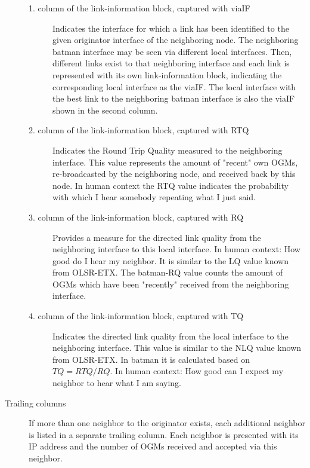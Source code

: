 \documentclass[11pt]{article}
\begin{document}
\begin{description}
\begin{description}

 \item[1. column of the link-information block, captured with viaIF] Indicates the interface for which a link has been identified to the given originator interface of the neighboring node. The neighboring batman interface may be seen via different local interfaces. Then, different links exist to that neighboring interface and each link is represented with its own link-information block, indicating the corresponding local interface as the viaIF. The local interface with the best link to the neighboring batman interface is also the viaIF shown in the second column.


 \item[2. column of the link-information block, captured with RTQ] Indicates the Round Trip Quality measured to the neighboring interface. This value represents the amount of "recent" own OGMs, re-broadcasted by the neighboring node, and received back by this node. In human context the RTQ value indicates the probability with which I hear somebody repeating what I just said.

 \item[3. column of the link-information block, captured with RQ] Provides a measure for the directed link quality from the neighboring interface to this local interface. In human context: How good do I hear my neighbor. It is similar to the LQ value known from OLSR-ETX. The batman-RQ value counts the amount of OGMs which have been "recently" received from the neighboring interface.

 \item[4. column of the link-information block, captured with TQ] Indicates the directed link quality from the local interface to the neighboring interface. This value is similar to the NLQ value known from OLSR-ETX. In batman it is calculated based on $TQ = RTQ / RQ$. In human context: How good can I expect my neighbor to hear what I am saying.

 \end{description}

 \item[Trailing columns] If more than one neighbor to the originator exists, each additional neighbor is listed in a separate trailing column. Each neighbor is presented with its IP address and the number of OGMs received and accepted via this neighbor.

 \end{description}
\end{document}
